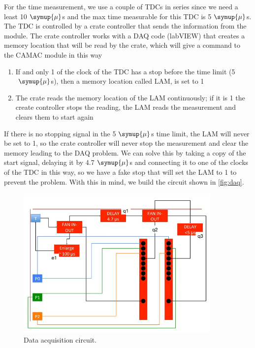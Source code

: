 For the time measurement, we use a couple of TDCs in series since we need a least 10$\;\symup{\mu}$s
and the max time measurable for this TDC is 5$\;\symup{\mu}$s.
The TDC is controlled by a crate controller that sends the information 
from the module. The crate controller works with a DAQ code (labVIEW) 
that creates a memory location that will be read by the crate, which will give a command to the
CAMAC module in this way
\begin{enumerate}
  \item If and only 1 of the clock of the TDC has a stop before the time limit (5$\;\symup{\mu}$s), then a memory location called LAM, is set to 1
  \item The crate reads the memory location of the LAM continuously; if it is 1 the create controller stops the reading, the LAM reads the measurement and clears them to start again
\end{enumerate}
 If there is no stopping signal in the 5$\;\symup{\mu}$s time limit, the LAM will never be set to 1, so the crate controller will never stop the measurement and clear the memory leading to the DAQ problem. We can solve this by taking a copy of the start signal, delaying it by 4.7$\;\symup{\mu}$s and connecting it to one of the clocks of the TDC in this way, so we have
a fake stop that will set the LAM to 1 to prevent the problem. With this in mind, we build the circuit shown in \autoref{fig:daq}.\\
\begin{figure}[h]
\begin{center}
\includegraphics[width=100mm]{figures/cattura4.png}
\end{center}
\caption{Data acquisition circuit.}
\label{fig:daq}
\end{figure}

